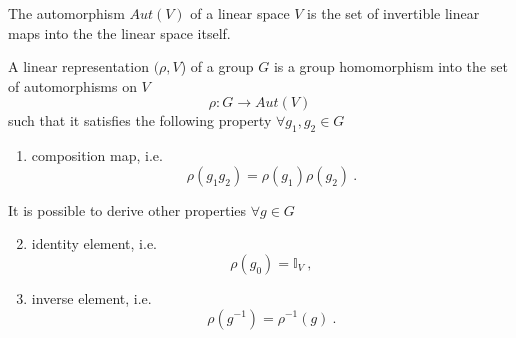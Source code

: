    \begin{definition}[Automorphism]
        The automorphism $Aut(V)$ of a linear space $V$ is the set of invertible linear maps into the the linear space itself.
    \end{definition}
    \begin{definition}[Representation]
        A linear representation $(\rho, V$) of a group $G$ is a group homomorphism into the set of automorphisms on $V$
        \begin{equation*}
            \rho \colon G \rightarrow Aut(V) 
        \end{equation*}
        such that it satisfies the following property $\forall g_1, g_2 \in G$
        \begin{enumerate}
            \item composition map, i.e.
            \begin{equation}\label{comprep}
                \rho(g_1 g_2) = \rho(g_1) \rho(g_2) ~.
            \end{equation}
        \end{enumerate}
    \end{definition}
    \noindent It is possible to derive other properties $\forall g \in G$
    \begin{enumerate}
    \setcounter{enumi}{1}
        \item identity element, i.e.
        \begin{equation}\label{repid}
            \rho(g_0) = \mathbb I_V ~,
        \end{equation}
        \item inverse element, i.e.
        \begin{equation*}
            \rho(g^{-1}) = \rho^{-1}(g) ~.
        \end{equation*}
    \end{enumerate}
